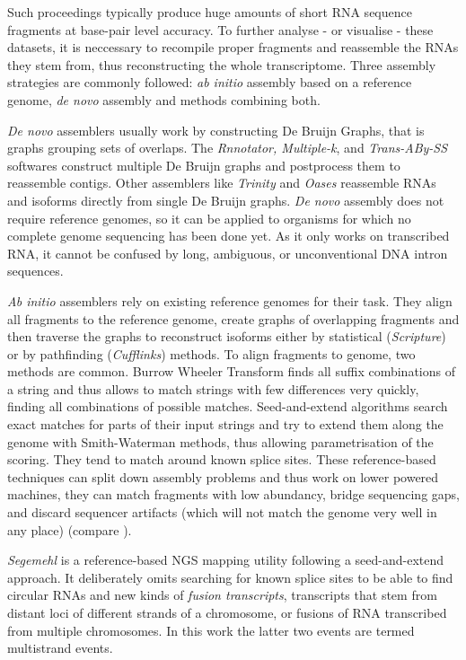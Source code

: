 \documentclass[11pt]{article}
\begin{document}
Such proceedings typically produce huge amounts of short RNA sequence fragments at base-pair 
level accuracy.
To further analyse - or visualise - these datasets, it is neccessary to recompile proper 
fragments and reassemble the RNAs they stem from, thus reconstructing the whole transcriptome.
Three assembly strategies are commonly followed: \emph{ab initio} assembly based on a reference 
genome, \emph{de novo} assembly and methods combining both.

\emph{De novo} assemblers usually work by constructing De Bruijn Graphs, that is graphs grouping
sets of overlaps. The \emph{Rnnotator, Multiple-k}, and \emph{Trans-ABy-SS} softwares construct multiple
De Bruijn graphs and postprocess them to reassemble contigs. Other assemblers like \emph{Trinity}
and \emph{Oases} reassemble RNAs and isoforms directly from single De Bruijn graphs.
\emph{De novo} assembly does not require reference genomes, so it can be applied to organisms for
which no complete genome sequencing has been done yet. As it only works on transcribed RNA,
it cannot be confused by long, ambiguous, or unconventional DNA intron sequences.

\emph{Ab initio} assemblers rely on existing reference genomes for their task. They align all
fragments to the reference genome, create graphs of overlapping fragments and then traverse
the graphs to reconstruct isoforms either by statistical (\emph{Scripture}) or by pathfinding 
(\emph{Cufflinks}) methods.
To align fragments to genome, two methods are common.
Burrow Wheeler Transform finds all suffix combinations of a string and thus allows to
match strings with few differences very quickly, finding all combinations of possible matches.
Seed-and-extend algorithms search exact matches for parts of their input strings and try to
extend them along the genome with Smith-Waterman methods, thus allowing parametrisation of the
scoring. They tend to match around known splice sites.
These reference-based techniques can split down assembly problems and thus work on lower powered
machines, they can match fragments with low abundancy, bridge sequencing gaps, and discard 
sequencer artifacts (which will not match the genome very well in any place) (compare 
\cite{martin2011}).

\emph{Segemehl} is a reference-based NGS mapping utility following a seed-and-extend approach. It
deliberately omits searching for known splice sites to be able to find circular RNAs and new 
kinds of \emph{fusion transcripts}, transcripts that stem from distant loci of different strands of a 
chromosome, or fusions of RNA transcribed from multiple chromosomes. In this work the latter two
events are termed multistrand events.
\end{document}
